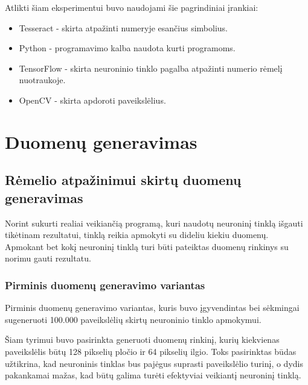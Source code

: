 \documentclass{VUMIFInfBakalaurinis}
\begin{document}
Atlikti šiam eksperimentui buvo naudojami šie pagrindiniai įrankiai:

\begin{itemize}[itemsep=0.5pt]
  \item Tesseract - skirta atpažinti numeryje esančius simbolius.
  \item Python - programavimo kalba naudota kurti programoms.
  \item TensorFlow - skirta neuroninio tinklo pagalba atpažinti numerio rėmelį nuotraukoje.
  \item OpenCV - skirta apdoroti paveikslėlius.
\end{itemize}

\pagebreak
\section{Duomenų generavimas}

\subsection{Rėmelio atpažinimui skirtų duomenų generavimas} \label{Mokymo duomenų generavimas}
Norint sukurti realiai veikiančią programą, kuri naudotų neuroninį tinklą išgauti tikėtinam rezultatui,
tinklą reikia apmokyti su dideliu kiekiu duomenų. Apmokant bet kokį neuroninį tinklą turi būti pateiktas
duomenų rinkinys su norimu gauti rezultatu. 

\subsubsection{Pirminis duomenų generavimo variantas}
Pirminis duomenų generavimo variantas, kuris buvo įgyvendintas bei sėkmingai sugeneruoti 100.000 paveikslėlių skirtų neuroninio tinklo apmokymui.

Šiam tyrimui buvo pasirinkta generuoti duomenų rinkinį, kurių kiekvienas paveikslėlis būtų 128 pikselių
pločio ir 64 pikselių ilgio. Toks pasirinktas būdas užtikrina, kad neuroninis tinklas bus pajėgus suprasti 
paveikslėlio turinį, o dydis pakankamai mažas, kad būtų galima turėti efektyviai veikiantį neuroninį tinklą.
\end{document}
